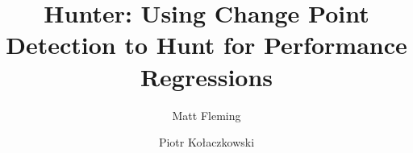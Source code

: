 \documentclass[sigconf]{acmart}
\begin{document}
\title{Hunter: Using Change Point Detection to Hunt for Performance Regressions}

%
%
%
%
%
%
%

\author{Matt Fleming}

\author{Piotr Kołaczkowski}
\end{document}
